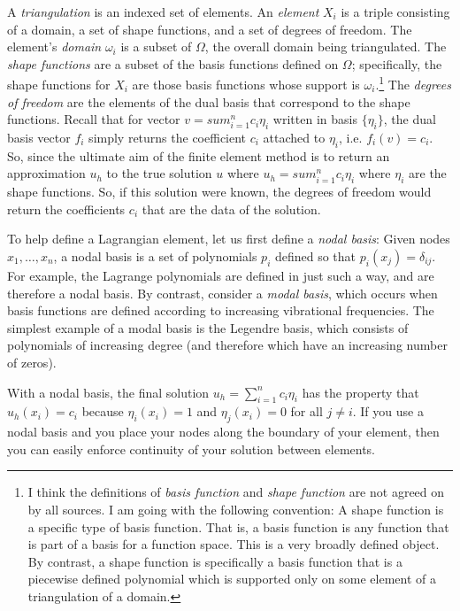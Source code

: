 \documentclass{amsart}
\begin{document}
A \textit{triangulation} is an indexed set of elements. An \textit{element}
$X_i$ is a triple consisting of a domain, a set of shape functions, and a set
of degrees of freedom. The element's \textit{domain} $\omega_i$ is a subset of
$\Omega$, the overall domain being triangulated. The \textit{shape functions}
are a subset of the basis functions defined on $\Omega$; specifically, the
shape functions for $X_i$ are those basis functions whose support is
$\omega_i$.\footnote{I think the definitions of \textit{basis function} and
\textit{shape function} are not agreed on by all sources. I am going with the
following convention: A shape function is a specific type of basis function.
That is, a basis function is any function that is part of a basis for a
function space. This is a very broadly defined object. By contrast, a shape
function is specifically a basis function that is a piecewise defined
polynomial which is supported only on some element of a triangulation of a
domain.} The \textit{degrees of freedom} are the elements of the dual basis
that correspond to the shape functions. Recall that for vector $v = sum_{i=1}^n
c_i \eta_i$ written in basis $\{\eta_i\}$, the dual basis vector $f_i$ simply
returns the coefficient $c_i$ attached to $\eta_i$, i.e. $f_i(v) = c_i$. So,
since the ultimate aim of the finite element method is to return an
approximation $u_h$ to the true solution $u$ where $u_h = sum_{i=1}^n c_i
\eta_i$ where $\eta_i$ are the shape functions. So, if this solution were
known, the degrees of freedom would return the coefficients $c_i$ that are the
data of the solution.

To help define a Lagrangian element, let us first define a \textit{nodal
basis}: Given nodes $x_1, \dots, x_n$, a nodal basis is a set of polynomials
$p_i$ defined so that $p_i(x_j) = \delta_{ij}$. For example, the Lagrange
polynomials are defined in just such a way, and are therefore a nodal basis. By
contrast, consider a \textit{modal basis}, which occurs when basis functions
are defined according to increasing vibrational frequencies. The simplest
example of a modal basis is the Legendre basis, which consists of polynomials
of increasing degree (and therefore which have an increasing number of zeros).

With a nodal basis, the final solution $u_h = \sum_{i=1}^{n} c_i \eta_i$ has
the property that $u_h(x_i) = c_i$ because $\eta_i(x_i) = 1$ and $\eta_j(x_i) =
0$ for all $j \neq i$. If you use a nodal basis and you place your nodes along
the boundary of your element, then you can easily enforce continuity of your
solution between elements. 
\end{document}
